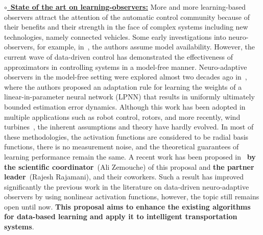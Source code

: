 \documentclass[a4paper,11pt]{article}
\begin{document}
\noindent
\underline{$\circ$~\bf State of the art on learning-observers:} More and more learning-based observers attract the attention of the automatic control community because of their benefits and their strength in the face of complex systems including new technologies, namely connected vehicles. Some early investigations into neuro-observers, for example, in~\cite{theocharis1994neural}, the authors assume model availability. However, the current wave of data-driven control has demonstrated the effectiveness of approximators in controlling systems in a model-free manner. Neuro-adaptive observers in the model-free setting were explored almost two decades ago in~\cite{Kim1997}, where the authors proposed an adaptation rule for learning the weights of a linear-in-parameter neural network (LPNN) that results in uniformly ultimately bounded estimation error dynamics. Although this work has been adopted in multiple applications such as robot control, rotors, and more recently, wind turbines~\cite{Rahimilarki2019}, the inherent assumptions and theory have hardly evolved. In most of these methodologies, the activation functions are considered to be radial basis functions, there is no measurement noise, and the theoretical guarantees of learning performance remain the same. 
A recent work has been proposed in~\cite{ChakrabartyCDC2019} {\bf by the scientific coordinator}~({Ali \sc Zemouche}) of this proposal and {\bf the partner leader}~(Rajesh {\sc Rajamani}), and their coworkers. Such a result has improved significantly the previous work in the literature on data-driven neuro-adaptive observers by using nonlinear activation functions, however, the topic still remains open until now. {\bf This proposal aims to enhance the existing algorithms for data-based learning and apply it to intelligent transportation systems}.














\end{document}

